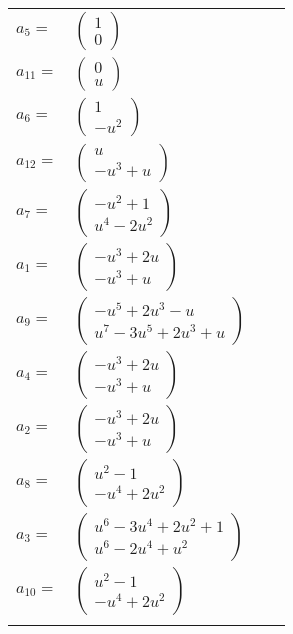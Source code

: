 \documentclass[1p]{elsarticle_modified}
\theoremstyle{definition}
\begin{document}
\begin{tabular}{m{7pt} m{180pt} m{7pt} m{180pt} }
\flushright $a_{5}=$&$\begin{pmatrix}1\\0\end{pmatrix}$ \\
\flushright $a_{11}=$&$\begin{pmatrix}0\\u\end{pmatrix}$ \\
\flushright $a_{6}=$&$\begin{pmatrix}1\\- u^2\end{pmatrix}$ \\
\flushright $a_{12}=$&$\begin{pmatrix}u\\- u^3+u\end{pmatrix}$ \\
\flushright $a_{7}=$&$\begin{pmatrix}- u^2+1\\u^4-2 u^2\end{pmatrix}$ \\
\flushright $a_{1}=$&$\begin{pmatrix}- u^3+2 u\\- u^3+u\end{pmatrix}$ \\
\flushright $a_{9}=$&$\begin{pmatrix}- u^5+2 u^3- u\\u^7-3 u^5+2 u^3+u\end{pmatrix}$ \\
\flushright $a_{4}=$&$\begin{pmatrix}- u^3+2 u\\- u^3+u\end{pmatrix}$ \\
\flushright $a_{2}=$&$\begin{pmatrix}- u^3+2 u\\- u^3+u\end{pmatrix}$ \\
\flushright $a_{8}=$&$\begin{pmatrix}u^2-1\\- u^4+2 u^2\end{pmatrix}$ \\
\flushright $a_{3}=$&$\begin{pmatrix}u^6-3 u^4+2 u^2+1\\u^6-2 u^4+u^2\end{pmatrix}$ \\
\flushright $a_{10}=$&$\begin{pmatrix}u^2-1\\- u^4+2 u^2\end{pmatrix}$\\&\end{tabular}
\end{document}
